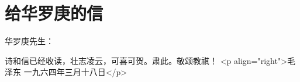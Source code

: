 \section[给华罗庚的信（一九六四年三月十八日）]{给华罗庚的信}


华罗庚先生：

诗和信已经收读，壮志凌云，可喜可贺。肃此。敬颂教祺！
<p align="right">毛泽东
一九六四年三月十八日</p>


